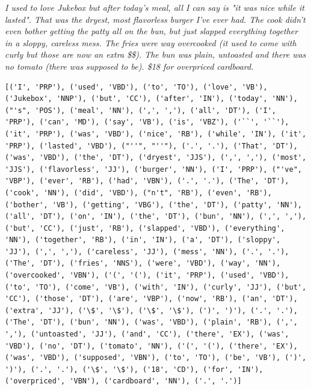 \textit{I used to love Jukebox but after today's meal, all I can say is "it was nice while it lasted". That was the dryest, most flavorless burger I've ever had. The cook didn't even bother getting the patty all on the bun, but just slapped everything together in a sloppy, careless mess. The fries were way overcooked (it used to come with curly but those are now an extra \$\$). The bun was plain, untoasted and there was no tomato (there was supposed to be). \$18 for overpriced cardboard.}\\
\begin{Verbatim}[breaklines=true, breakanywhere=true] 
[('I', 'PRP'), ('used', 'VBD'), ('to', 'TO'), ('love', 'VB'), ('Jukebox', 'NNP'), ('but', 'CC'), ('after', 'IN'), ('today', 'NN'), ("'s", 'POS'), ('meal', 'NN'), (',', ','), ('all', 'DT'), ('I', 'PRP'), ('can', 'MD'), ('say', 'VB'), ('is', 'VBZ'), ('``', '``'), ('it', 'PRP'), ('was', 'VBD'), ('nice', 'RB'), ('while', 'IN'), ('it', 'PRP'), ('lasted', 'VBD'), ("''", "''"), ('.', '.'), ('That', 'DT'), ('was', 'VBD'), ('the', 'DT'), ('dryest', 'JJS'), (',', ','), ('most', 'JJS'), ('flavorless', 'JJ'), ('burger', 'NN'), ('I', 'PRP'), ("'ve", 'VBP'), ('ever', 'RB'), ('had', 'VBN'), ('.', '.'), ('The', 'DT'), ('cook', 'NN'), ('did', 'VBD'), ("n't", 'RB'), ('even', 'RB'), ('bother', 'VB'), ('getting', 'VBG'), ('the', 'DT'), ('patty', 'NN'), ('all', 'DT'), ('on', 'IN'), ('the', 'DT'), ('bun', 'NN'), (',', ','), ('but', 'CC'), ('just', 'RB'), ('slapped', 'VBD'), ('everything', 'NN'), ('together', 'RB'), ('in', 'IN'), ('a', 'DT'), ('sloppy', 'JJ'), (',', ','), ('careless', 'JJ'), ('mess', 'NN'), ('.', '.'), ('The', 'DT'), ('fries', 'NNS'), ('were', 'VBD'), ('way', 'NN'), ('overcooked', 'VBN'), ('(', '('), ('it', 'PRP'), ('used', 'VBD'), ('to', 'TO'), ('come', 'VB'), ('with', 'IN'), ('curly', 'JJ'), ('but', 'CC'), ('those', 'DT'), ('are', 'VBP'), ('now', 'RB'), ('an', 'DT'), ('extra', 'JJ'), ('\$', '\$'), ('\$', '\$'), (')', ')'), ('.', '.'), ('The', 'DT'), ('bun', 'NN'), ('was', 'VBD'), ('plain', 'RB'), (',', ','), ('untoasted', 'JJ'), ('and', 'CC'), ('there', 'EX'), ('was', 'VBD'), ('no', 'DT'), ('tomato', 'NN'), ('(', '('), ('there', 'EX'), ('was', 'VBD'), ('supposed', 'VBN'), ('to', 'TO'), ('be', 'VB'), (')', ')'), ('.', '.'), ('\$', '\$'), ('18', 'CD'), ('for', 'IN'), ('overpriced', 'VBN'), ('cardboard', 'NN'), ('.', '.')]
\end{Verbatim}
\newpage
